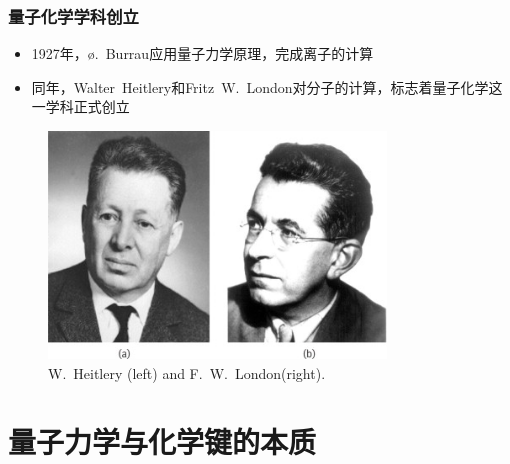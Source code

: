 {\frame
{
	\frametitle{量子化学学科创立}
	\begin{itemize}
		\item \textrm{1927}年，\textrm{\o.~Burrau}应用量子力学原理，完成\textrm{}离子的计算
		\item 同年，\textrm{Walter~Heitlery}和\textrm{Fritz~W.~London}对\textrm{}分子的计算，标志着量子化学这一学科正式创立
	\end{itemize}
\begin{figure}[h!]
\centering
\vspace{-1.5pt}
\hspace*{-0.12in}
\includegraphics[height=0.48\textwidth,width=0.80\textwidth,viewport=0 10 260 175,clip]{Figures/Walter-Heitlery_Fritz-W-London.jpeg}
\caption{\textrm{W.~Heitlery (left) and F.~W.~London(right).}}
\label{Heitlery_London}
\end{figure}
}

\section{量子力学与化学键的本质}
}
